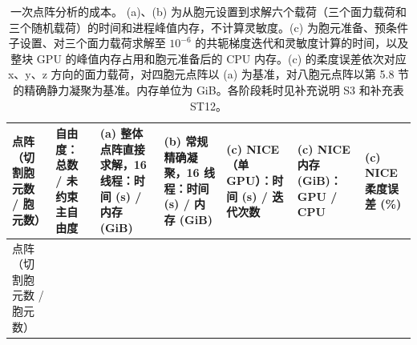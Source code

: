 \documentclass[preprint,12pt,authoryear]{elsarticle}
\begin{document}
{\footnotesize
\begin{longtable}[]{@{}
  >{\raggedright\arraybackslash}p{}
  >{\raggedright\arraybackslash}p{}
  >{\raggedright\arraybackslash}p{}
  >{\raggedright\arraybackslash}p{}
  >{\raggedright\arraybackslash}p{}
  >{\raggedright\arraybackslash}p{}
  >{\raggedright\arraybackslash}p{}@{}}
\caption{一次点阵分析的成本。 (a)、(b) 为从胞元设置到求解六个载荷（三个面力载荷和三个随机载荷）的时间和进程峰值内存，不计算灵敏度。(c) 为胞元准备、预条件子设置、对三个面力载荷求解至 \(10^{-6}\) 的共轭梯度迭代和灵敏度计算的时间，以及整块 GPU 的峰值内存占用和胞元准备后的 CPU 内存。(c) 的柔度误差依次对应 x、y、z 方向的面力载荷，对四胞元点阵以 (a) 为基准，对八胞元点阵以第 5.8 节的精确静力凝聚为基准。内存单位为 GiB。各阶段耗时见补充说明 S3 和补充表 ST12。}\tabularnewline
\toprule\noalign{}
\begin{minipage}[b]{\linewidth}\raggedright
点阵（切割胞元数 / 胞元数）
\end{minipage} & \begin{minipage}[b]{\linewidth}\raggedright
自由度：总数 / 未约束主自由度
\end{minipage} & \begin{minipage}[b]{\linewidth}\raggedright
(a) 整体点阵直接求解，16 线程：时间 (s) / 内存 (GiB)
\end{minipage} & \begin{minipage}[b]{\linewidth}\raggedright
(b) 常规精确凝聚，16 线程：时间 (s) / 内存 (GiB)
\end{minipage} & \begin{minipage}[b]{\linewidth}\raggedright
(c) NICE（单 GPU）：时间 (s) / 迭代次数
\end{minipage} & \begin{minipage}[b]{\linewidth}\raggedright
(c) NICE 内存 (GiB)：GPU / CPU
\end{minipage} & \begin{minipage}[b]{\linewidth}\raggedright
(c) NICE 柔度误差 (\%)
\end{minipage} \\
\midrule\noalign{}
\endfirsthead
\toprule\noalign{}
\begin{minipage}[b]{\linewidth}\raggedright
点阵（切割胞元数 / 胞元数）
\end{minipage} & \begin{minipage}[b]{\linewidth}\raggedright

\end{minipage}
\end{longtable}}
\end{document}
